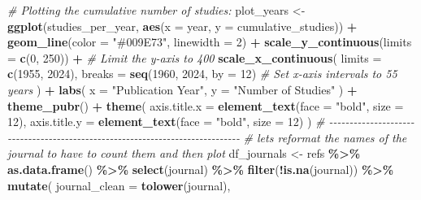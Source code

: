 \documentclass[
]{article}
\newenvironment{Shaded}{\begin{snugshade}}{\end{snugshade}}
\newcommand{\AttributeTok}[1]{\textcolor[rgb]{0.13,0.29,0.53}{#1}}
\newcommand{\CommentTok}[1]{\textcolor[rgb]{0.56,0.35,0.01}{\textit{#1}}}
\newcommand{\DecValTok}[1]{\textcolor[rgb]{0.00,0.00,0.81}{#1}}
\newcommand{\FunctionTok}[1]{\textcolor[rgb]{0.13,0.29,0.53}{\textbf{#1}}}
\newcommand{\NormalTok}[1]{#1}
\newcommand{\OtherTok}[1]{\textcolor[rgb]{0.56,0.35,0.01}{#1}}
\newcommand{\SpecialCharTok}[1]{\textcolor[rgb]{0.81,0.36,0.00}{\textbf{#1}}}
\newcommand{\StringTok}[1]{\textcolor[rgb]{0.31,0.60,0.02}{#1}}
\begin{document}
\begin{Shaded}
\begin{Highlighting}[]
\CommentTok{\# Plotting the cumulative number of studies:}
\NormalTok{plot\_years }\OtherTok{\textless{}{-}} 
  \FunctionTok{ggplot}\NormalTok{(studies\_per\_year, }\FunctionTok{aes}\NormalTok{(}\AttributeTok{x =}\NormalTok{ year, }\AttributeTok{y =}\NormalTok{ cumulative\_studies)) }\SpecialCharTok{+}
  \FunctionTok{geom\_line}\NormalTok{(}\AttributeTok{color =} \StringTok{"\#009E73"}\NormalTok{, }\AttributeTok{linewidth =} \DecValTok{2}\NormalTok{) }\SpecialCharTok{+}
  \FunctionTok{scale\_y\_continuous}\NormalTok{(}\AttributeTok{limits =} \FunctionTok{c}\NormalTok{(}\DecValTok{0}\NormalTok{, }\DecValTok{250}\NormalTok{)) }\SpecialCharTok{+}  \CommentTok{\# Limit the y{-}axis to 400}
  \FunctionTok{scale\_x\_continuous}\NormalTok{(}
    \AttributeTok{limits =} \FunctionTok{c}\NormalTok{(}\DecValTok{1955}\NormalTok{, }\DecValTok{2024}\NormalTok{),}
    \AttributeTok{breaks =} \FunctionTok{seq}\NormalTok{(}\DecValTok{1960}\NormalTok{, }\DecValTok{2024}\NormalTok{, }\AttributeTok{by =} \DecValTok{12}\NormalTok{)  }\CommentTok{\# Set x{-}axis intervals to 55 years}
\NormalTok{  ) }\SpecialCharTok{+}
  \FunctionTok{labs}\NormalTok{(}
    \AttributeTok{x =} \StringTok{"Publication Year"}\NormalTok{,}
    \AttributeTok{y =} \StringTok{"Number of Studies"}
\NormalTok{  ) }\SpecialCharTok{+}
  \FunctionTok{theme\_pubr}\NormalTok{() }\SpecialCharTok{+}
  \FunctionTok{theme}\NormalTok{(}
    \AttributeTok{axis.title.x =} \FunctionTok{element\_text}\NormalTok{(}\AttributeTok{face =} \StringTok{"bold"}\NormalTok{, }\AttributeTok{size =} \DecValTok{12}\NormalTok{),}
    \AttributeTok{axis.title.y =} \FunctionTok{element\_text}\NormalTok{(}\AttributeTok{face =} \StringTok{"bold"}\NormalTok{, }\AttributeTok{size =} \DecValTok{12}\NormalTok{)}
\NormalTok{  )}
\CommentTok{\# {-}{-}{-}{-}{-}{-}{-}{-}{-}{-}{-}{-}{-}{-}{-}{-}{-}{-}{-}{-}{-}{-}{-}{-}{-}{-}{-}{-}{-}{-}{-}{-}{-}{-}{-}{-}{-}{-}{-}{-}{-}{-}{-}{-}{-}{-}{-}{-}{-}{-}{-}{-}{-}{-}{-}{-}{-}{-}{-}{-}{-}{-}{-}{-}{-}{-}{-}{-}{-}{-}{-}{-}{-}{-}{-}{-}{-}{-}}
\CommentTok{\# lets reformat the names of the journal to have to count them and then plot}
\NormalTok{df\_journals }\OtherTok{\textless{}{-}}\NormalTok{ refs }\SpecialCharTok{\%\textgreater{}\%}
  \FunctionTok{as.data.frame}\NormalTok{() }\SpecialCharTok{\%\textgreater{}\%}
  \FunctionTok{select}\NormalTok{(journal) }\SpecialCharTok{\%\textgreater{}\%}
  \FunctionTok{filter}\NormalTok{(}\SpecialCharTok{!}\FunctionTok{is.na}\NormalTok{(journal)) }\SpecialCharTok{\%\textgreater{}\%}
  \FunctionTok{mutate}\NormalTok{(}
    \AttributeTok{journal\_clean =} \FunctionTok{tolower}\NormalTok{(journal),}

\end{Highlighting}
\end{Shaded}
\end{document}
